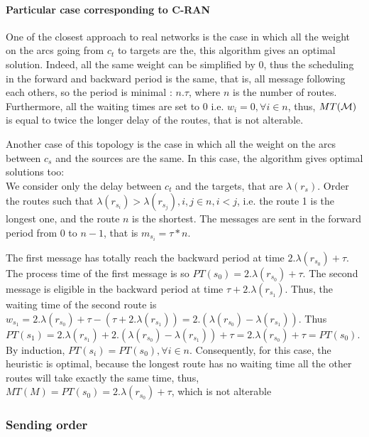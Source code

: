 \documentclass[a4paper,10pt]{article}
\begin{document}
	\paragraph{Particular case corresponding to C-RAN}
		
	One of the closest approach to real networks is the case in which all the weight on the arcs going from $c_t$ to targets are the, this algorithm gives an optimal solution. Indeed, all the same weight can be simplified by 0, thus the scheduling in the forward and backward period is the same, that is, all message following each others, so the period is minimal : $n.\tau$, where $n$ is the number of routes. Furthermore, all the waiting times are set to 0 i.e. $w_i = 0,\forall i \in n$, thus, $MT({\cal M})$ is equal to twice the longer delay of the routes, that is not alterable.

	Another case of this topology is the case in which all the weight on the arcs between $c_s$ and the sources are the same.
	In this case, the algorithm gives optimal solutions too:\\

	We consider only the delay between $c_t$ and the targets, that are $\lambda(r_{s})$. Order the routes such that $\lambda(r_{s_i}) > \lambda(r_{s_j}), i,j \in n, i<j$, i.e. the route 1 is the longest one, and the route $n$ is the shortest.
	The messages are sent in the forward period from 0 to $n-1$, that is $m_{s_i} = \tau * n$.

	The first message has totally reach the backward period at time $2.\lambda(r_{s_0})+\tau$. The process time of the first message is so $PT(s_0) = 2.\lambda(r_{s_0}) + \tau$.
	The second message is eligible in the backward period at time $\tau + 2.\lambda(r_{s_1})$. Thus, the waiting time of the second route is $w_{s_1} = 2.\lambda(r_{s_0})+\tau - (\tau + 2.\lambda(r_{s_1})) = 2.(\lambda(r_{s_0}) - \lambda(r_{s_1}))$. Thus $PT(s_1) = 2.\lambda(r_{s_1}) + 2.(\lambda(r_{s_0}) - \lambda(r_{s_1})) +\tau = 2.\lambda(r_{s_0}) + \tau = PT(s_0)$.
	By induction, $PT(s_i) = PT(s_0), \forall i \in n$. 
	Consequently, for this case, the heuristic is optimal, because the longest route has no waiting time all the other routes will take exactly the same time, thus, $MT(M) = PT(s_0) = 2.\lambda(r_{s_0}) + \tau$, which is not alterable

	
	

     \subsubsection{Sending order}
     
\end{document}
